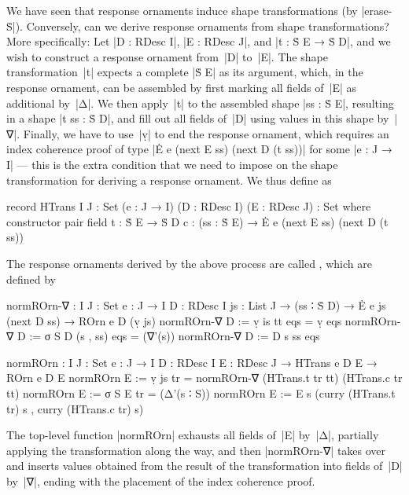 We have seen that response ornaments induce shape transformations (by |erase-Ṡ|).
Conversely, can we derive response ornaments from shape transformations?
More specifically: Let |D : RDesc I|, |E : RDesc J|, and |t : Ṡ E → Ṡ D|, and we wish to construct a response ornament from~|D| to~|E|.
The shape transformation~|t| expects a complete |Ṡ E| as its argument, which, in the response ornament, can be assembled by first marking all fields of~|E| as additional by~|Δ|.
We then apply~|t| to the assembled shape |ss : Ṡ E|, resulting in a shape |t ss : Ṡ D|, and fill out all fields of~|D| using values in this shape by~|∇|.
Finally, we have to use~|ṿ| to end the response ornament, which requires an index coherence proof of type |Ė e (next E ss) (next D (t ss))| for some |e : J → I| --- this is the extra condition that we need to impose on the shape transformation for deriving a response ornament.
We thus define  as
\begin{code}
record HTrans {I J : Set} (e : J → I) (D : RDesc I) (E : RDesc J) : Set
  where
    constructor pair
    field
      t  : Ṡ E → Ṡ D
      c  : (ss : Ṡ E) → Ė e (next E ss) (next D (t ss))
\end{code}
The response ornaments derived by the above process are called , which are defined by
\begin{code}
normROrn-∇ :  {I J : Set} {e : J → I} {D : RDesc I} {js : List J} →
              (ss ∶ Ṡ D) → Ė e js (next D ss) → ROrn e D (ṿ js)
normROrn-∇ {D := ṿ is   } tt        eqs = ṿ eqs
normROrn-∇ {D := σ S D  } (s , ss)  eqs = (∇'(s)) normROrn-∇ {D := D s} ss eqs

normROrn :  {I J : Set} {e : J → I} {D : RDesc I} {E : RDesc J} →
            HTrans e D E → ROrn e D E
normROrn {E := ṿ js   } tr = normROrn-∇ (HTrans.t tr tt) (HTrans.c tr tt)
normROrn {E := σ S E  } tr =
  (Δ'(s ∶ S)) normROrn {E := E s} (curry (HTrans.t tr) s , curry (HTrans.c tr) s)
\end{code}
The top-level function |normROrn| exhausts all fields of~|E| by~|Δ|, partially applying the transformation along the way, and then |normROrn-∇| takes over and inserts values obtained from the result of the transformation into fields of~|D| by~|∇|, ending with the placement of the index coherence proof.

